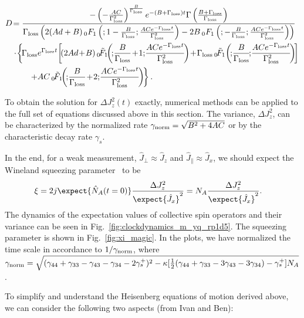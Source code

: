 \documentclass[]{report}
\begin{document}
\begin{align}
D &\!= \frac{- \left(-\frac{AC }{\Gamma_{\rm loss}^2 }\right)^{\frac{ B}{\Gamma_{\rm loss} }} e^{-(B+\Gamma_{\rm loss})t} \Gamma \left(\frac{B+\Gamma_{\rm loss} }{\Gamma_{\rm loss} }\right) }
{\Gamma_{\rm loss}  \left(2 (A d+B) \, _0F_1\left(;1-\frac{B}{\Gamma_{\rm loss} };\frac{A C e^{-\Gamma_{\rm loss} t}}{\Gamma_{\rm loss} ^2}\right)-2 B \, _0F_1\left(;-\frac{B}{\Gamma_{\rm loss} };\frac{A C e^{-\Gamma_{\rm loss}t }}{\Gamma_{\rm loss} ^2}\right)\right)}\nonumber\\
&\cdot\! \left\{\!\Gamma_{\rm loss}  e^{\Gamma_{\rm loss}  t}\! \left[\!(2 A d \!+\! B) \, _0\!\tilde{F}_1\!\!\left(\!;\!\frac{B}{\Gamma_{\rm loss} }\!+\!1;\!\frac{A C e^{-\Gamma_{\rm loss} t}}{\Gamma_{\rm loss} ^2}\!\right)\!+\!\Gamma_{\rm loss}  \, _0\!\tilde{F}_1\!\left(\!;\!\frac{B}{\Gamma_{\rm loss} }\!;\!\frac{A C e^{-\Gamma_{\rm loss} t}}{\Gamma_{\rm loss} ^2}\!\right)\!\right]\right. \nonumber\\
&\quad \quad \left. +A C \, _0\!\tilde{F}_1\!\!\left(\!;\!\frac{B}{\Gamma_{\rm loss} }\!+\! 2;\!\frac{A C e^{-\Gamma_{\rm loss} t }}{\Gamma_{\rm loss} ^2}\!\right)\!\right\}.
\end{align}

To obtain the solution for $ \Delta J_z^2(t) $ exactly, numerical methods can be applied to the full set of equations discussed above in this section. 
The variance, $\Delta J_z^2 $, can be characterized by the normalized rate $ \gamma_{\rm norm}= \sqrt{B^2 + 4 AC}$ or by the characteristic decay rate $ \gamma_s $. 

In the end, for a weak measurement, $ \hat{J}_\perp\approx \hat{J}_z $ and $ \hat{J}_\parallel\approx\hat{J}_x $, we should expect the Wineland squeezing parameter~\cite{Wineland1992} to be
\begin{align}
\xi &= 2j\expect{\hat{N}_A(t=0)}\frac{\Delta J_z^2}{\expect{\hat{J}_x}^2}
=N_A\frac{\Delta J_z^2}{\expect{\hat{J}_x}^2}.
\end{align}
The dynamics of the expectation values of collective spin operators and their variance can be seen in Fig.~\ref{fig:clockdynamics_m_yq_rp1d5}. The squeezing parameter is shown in Fig.~\ref{fig:xi_magic}. 
In the plots, we have normalized the time scale in accordance to $ 1/\gamma_{\rm norm} $, where $ \gamma_{\rm norm} = \sqrt{ (\gamma_{44} +\gamma_{33} -\gamma_{43} -\gamma_{34} -2\gamma_s^+ )^2 -\kappa [\frac{1}{2}(\gamma_{44} +\gamma_{33} -3\gamma_{43} -3\gamma_{34}) -\gamma_s^+ ] N_A } $.


To simplify and understand the Heisenberg equations of motion derived above, we can consider the following two aspects (from Ivan and Ben):
\end{document}
